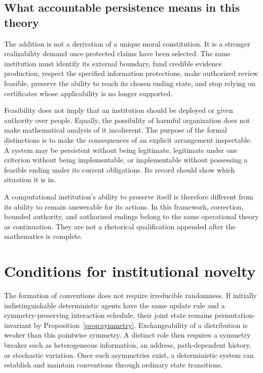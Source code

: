 \documentclass[11pt,letterpaper]{article}
\theoremstyle{plain}
\theoremstyle{definition}
\theoremstyle{remark}
\begin{document}
\subsection{What accountable persistence means in this theory}

The addition is not a derivation of a unique moral constitution. It is a stronger realizability demand once protected claims have been selected. The same institution must identify its external boundary, fund credible evidence production, respect the specified information protections, make authorized review feasible, preserve the ability to reach its chosen ending state, and stop relying on certificates whose applicability is no longer supported.

Feasibility does not imply that an institution should be deployed or given authority over people. Equally, the possibility of harmful organization does not make mathematical analysis of it incoherent. The purpose of the formal distinctions is to make the consequences of an explicit arrangement inspectable. A system may be persistent without being legitimate, legitimate under one criterion without being implementable, or implementable without possessing a feasible ending under its current obligations. Its record should show which situation it is in.

A computational institution's ability to preserve itself is therefore different from its ability to remain answerable for its actions. In this framework, correction, bounded authority, and authorized endings belong to the same operational theory as continuation. They are not a rhetorical qualification appended after the mathematics is complete.



\FloatBarrier
\section{Conditions for institutional novelty}\label{sec:novelty}

The formation of conventions does not require irreducible randomness. If initially indistinguishable deterministic agents have the same update rule and a symmetry-preserving interaction schedule, their joint state remains permutation-invariant by Proposition~\ref{prop:symmetry}. Exchangeability of a distribution is weaker than this pointwise symmetry. A distinct role then requires a symmetry breaker such as heterogeneous information, an address, path-dependent history, or stochastic variation. Once such asymmetries exist, a deterministic system can establish and maintain conventions through ordinary state transitions.
\end{document}
